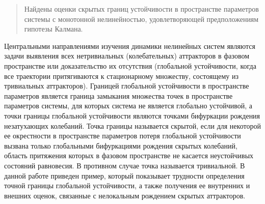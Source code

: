 
\maketitle

\begin{abstract}
Найдены оценки скрытых границ устойчивости в пространстве параметров системы с монотонной нелинейностью, удовлетворяющей предположениям гипотезы Калмана.

\end{abstract}


Центральными направлениями изучения динамики нелинейных систем являются задачи выявления всех нетривиальных (колебательных) аттракторов в фазовом пространстве или доказательство их отсутствия (глобальной устойчивости, когда все траектории притягиваются к стационарному множеству, состоящему из тривиальных аттракторов). Границей глобальной устойчивости в пространстве параметров является граница замыкания множества точек в пространстве параметров системы, для которых система не является глобально устойчивой, а точки границы глобальной устойчивости являются точками бифуркации рождения незатухающих колебаний. Точка границы называется скрытой, если для некоторой ее окрестности в пространстве параметров потеря глобальной устойчивости вызвана только глобальными бифуркациями рождения скрытых колебаний, область притяжения которых в фазовом пространстве не касается неустойчивых состояний равновесия. В противном случае точка называется тривиальной. В данной работе приведен пример, который показывает трудности определения точной границы глобальной устойчивости, а также получения ее внутренних и внешних оценок, связанные с нелокальным рождением скрытых аттракторов. 

